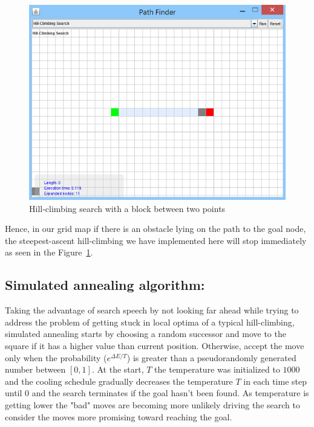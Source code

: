 \documentclass[a4paper]{article}
\begin{document}
\begin{figure}[h!]
  \centering
    \includegraphics[scale=.9]{images/hillclimb1.png}
  \caption{Hill-climbing search with a block between two points}
  \label{fig:hillClimbing}
\end{figure}

\noindent
Hence, in our grid map if there is an obstacle lying on the path to the goal node, the steepest-ascent hill-climbing we have implemented here will stop immediately as seen in the Figure~\ref{fig:hillClimbing}.


\subsection{Simulated annealing algorithm:}

Taking the advantage of search speech by not looking far ahead while trying to address the problem of getting stuck in local optima of a typical hill-climbing, simulated annealing starts by choosing a random successor and move to the square if it has a higher value than current position. Otherwise, accept the move only when the probability ($e^{\Delta E/T}$) is greater than a pseudorandomly generated number between $[0, 1]$. At the start, $T$ the temperature was initialized to $1000$ and the cooling schedule gradually decreases the temperature $T$ in each time step until $0$ and the search terminates if the goal hasn't been found. As temperature is getting lower the "bad" moves are becoming more unlikely driving the search to consider the moves more promising toward reaching the goal. \\
\end{document}
